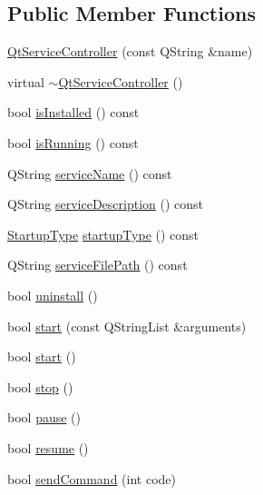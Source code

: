 \subsection*{Public Member Functions}
\begin{DoxyCompactItemize}
\item 
\mbox{\hyperlink{class_qt_service_controller_ab5c5bb7d168d2e59f0784ded380d7adf}{Qt\+Service\+Controller}} (const Q\+String \&name)
\item 
virtual \mbox{\hyperlink{class_qt_service_controller_a3288eead2b9862c3a70e7decbaebc908}{$\sim$\+Qt\+Service\+Controller}} ()
\item 
bool \mbox{\hyperlink{class_qt_service_controller_a7e36fb18a273118709faf22f732feac4}{is\+Installed}} () const
\item 
bool \mbox{\hyperlink{class_qt_service_controller_a4a11b35468848388174a36af66f25fc3}{is\+Running}} () const
\item 
Q\+String \mbox{\hyperlink{class_qt_service_controller_a3df972ecd01a00fff5cda316ae35cbea}{service\+Name}} () const
\item 
Q\+String \mbox{\hyperlink{class_qt_service_controller_a503c0fadf098b4c5bbccbb2a57f911e2}{service\+Description}} () const
\item 
\mbox{\hyperlink{class_qt_service_controller_a946ac2b079d9760503da923c2eaf0aac}{Startup\+Type}} \mbox{\hyperlink{class_qt_service_controller_acfd3b5cb23c17bf415f1d606b8461109}{startup\+Type}} () const
\item 
Q\+String \mbox{\hyperlink{class_qt_service_controller_a5ab709fdeb3ab526c92ccbbe1b2706c6}{service\+File\+Path}} () const
\item 
bool \mbox{\hyperlink{class_qt_service_controller_a25cd2f1f6868ece5de77976eb55cb74c}{uninstall}} ()
\item 
bool \mbox{\hyperlink{class_qt_service_controller_a70f274d3f4f5a5fea60b8fd7331b31fb}{start}} (const Q\+String\+List \&arguments)
\item 
bool \mbox{\hyperlink{class_qt_service_controller_a5e9d6da5081d70f31611456d0ef0687e}{start}} ()
\item 
bool \mbox{\hyperlink{class_qt_service_controller_ad06afa647666769e309474b18bf7cf90}{stop}} ()
\item 
bool \mbox{\hyperlink{class_qt_service_controller_aeee2fcc9469f77c7ed8a7955c4fa3a07}{pause}} ()
\item 
bool \mbox{\hyperlink{class_qt_service_controller_a2d71eab6146427fc7b431386bf72eaec}{resume}} ()
\item 
bool \mbox{\hyperlink{class_qt_service_controller_a1428c7d51403416bc7663ae37c446cfc}{send\+Command}} (int code)
\end{DoxyCompactItemize}
